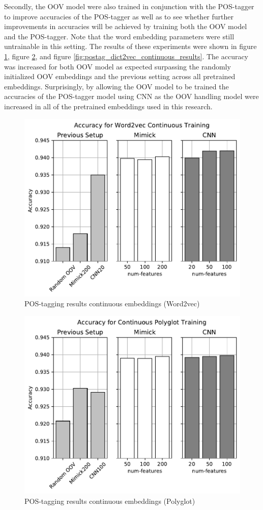       Secondly, the OOV model were also trained in conjunction with
      the POS-tagger to improve accuracies of the POS-tagger as well
      as to see whether further improvements in accuracies will be
      achieved by training both the OOV model and the POS-tagger. Note
      that the word embedding parameters were still untrainable in
      this setting. The results of these experiments were shown in
      figure \ref{fig:postag_word2vec_continuous_results}, figure
      \ref{fig:postag_polyglot_continuous_results}, and figure
      \ref{fig:postag_dict2vec_continuous_results}. The accuracy was
      increased for both OOV model as expected surpassing the randomly
      initialized OOV embeddings and the previous setting across all
      pretrained embeddings. Surprisingly, by allowing the OOV model
      to be trained the accuracies of the POS-tagger model using CNN
      as the OOV handling model were increased in all of the
      pretrained embeddings used in this research.
      \begin{figure}[H]
        \centering
        \includegraphics[width=0.8\linewidth]{images/continuous_word2vec.pdf}
        \caption{POS-tagging results continuous embeddings (Word2vec)}
        \label{fig:postag_word2vec_continuous_results}
      \end{figure}
      \begin{figure}[H]
        \centering
        \includegraphics[width=0.8\linewidth]{images/continuous_polyglot.pdf}
        \caption{POS-tagging results continuous embeddings (Polyglot)}
        \label{fig:postag_polyglot_continuous_results}
      \end{figure}
